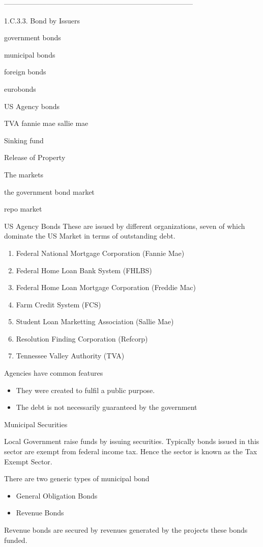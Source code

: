 --------------------------------------------------------------------------------


1.C.3.3. Bond by Issuers

government bonds

municipal bonds

foreign bonds

eurobonds

US Agency bonds

    TVA fannie mae sallie mae

Sinking fund

Release of Property

The markets


the government bond market

repo market



US Agency Bonds
These are issued by different organizations, seven of which dominate the US Market in terms of outstanding debt.

\begin{enumerate}
\item Federal National Mortgage Corporation (Fannie Mae)
\item Federal Home Loan Bank System (FHLBS)
\item Federal Home Loan Mortgage Corporation (Freddie Mac)
\item Farm Credit System (FCS)
\item Student Loan Marketting Association (Sallie Mae)
\item Resolution Finding Corporation (Refcorp)
\item Tennessee Valley Authority (TVA)
\end{enumerate}


Agencies have common features

\begin{itemize}
\item They were created to fulfil a public purpose.
\item The debt is not necessarily guaranteed by the government
\end{itemize}

Municipal Securities

Local Government raise funds by issuing securities. Typically bonds issued in this sector are exempt from 
federal income tax. Hence the sector is known as the Tax Exempt Sector.

There are two generic types of municipal bond
\begin{itemize}
\item General Obligation Bonds
\item Revenue Bonds
\end{itemize}
Revenue bonds are secured by revenues generated by the projects these bonds funded.

